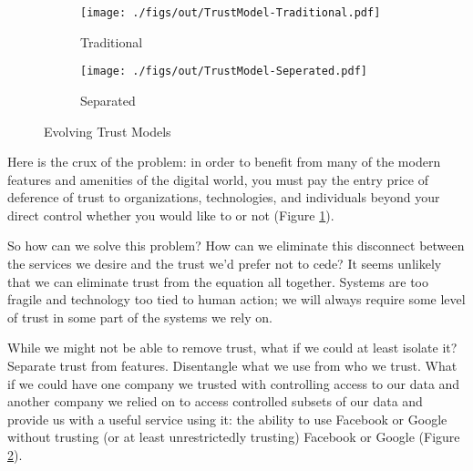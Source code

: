 \begin{figure}[!tb]
  \vspace{5ex}
  \begin{center}
    \begin{subfigure}{.32\textwidth}
      \begin{center}
        \texttt{[image: ./figs/out/TrustModel-Traditional.pdf]}
        \caption{Traditional}
        \label{fig:trust-traditional}
      \end{center}
    \end{subfigure}
    \begin{subfigure}{.65\textwidth}
      \begin{center}
        \texttt{[image: ./figs/out/TrustModel-Seperated.pdf]}
        \caption{Separated}
        \label{fig:trust-seperated}
      \end{center}
    \end{subfigure}
  \end{center}
  \caption{Evolving Trust Models}
  \label{fig:trust}
\end{figure}

Here is the crux of the problem: in order to benefit from many of the
modern features and amenities of the digital world, you must pay the
entry price of deference of trust to organizations, technologies, and
individuals beyond your direct control whether you would like to or
not (Figure \ref{fig:trust-traditional}).

So how can we solve this problem? How can we eliminate this disconnect
between the services we desire and the trust we'd prefer not to cede?
It seems unlikely that we can eliminate trust from the equation all
together. Systems are too fragile and technology too tied to human
action; we will always require some level of trust in some part of the
systems we rely on.

While we might not be able to remove trust, what if we could at least
isolate it? Separate trust from features. Disentangle what we use from
who we trust. What if we could have one company we trusted with
controlling access to our data and another company we relied on to
access controlled subsets of our data and provide us with a useful
service using it: the ability to use Facebook or Google without
trusting (or at least unrestrictedly trusting) Facebook or Google
(Figure \ref{fig:trust-seperated}).

